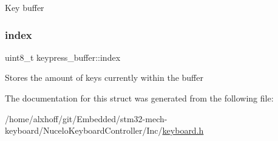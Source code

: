 Key buffer \mbox{\label{structkeypress__buffer_aa65a87852d890d7f8068122b36205e2d}} 
\subsubsection{\texorpdfstring{index}{index}}
{\footnotesize\ttfamily uint8\+\_\+t keypress\+\_\+buffer\+::index}

Stores the amount of keys currently within the buffer 

The documentation for this struct was generated from the following file\+:\begin{DoxyCompactItemize}
\item 
/home/alxhoff/git/\+Embedded/stm32-\/mech-\/keyboard/\+Nucelo\+Keyboard\+Controller/\+Inc/\hyperlink{keyboard_8h}{keyboard.\+h}\end{DoxyCompactItemize}
